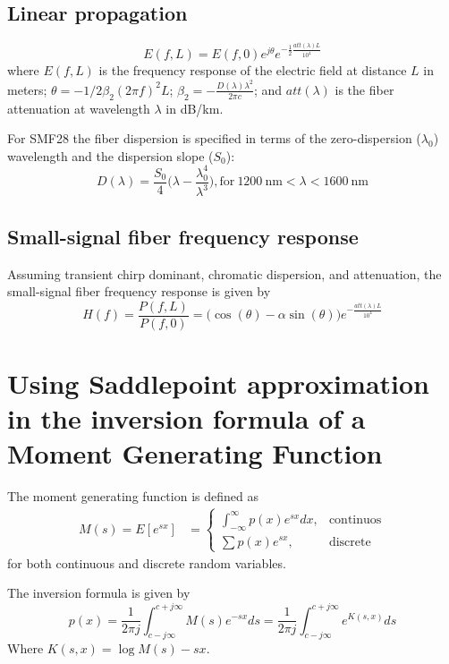 \subsection{Linear propagation}
\begin{equation}
	E(f, L) = E(f, 0)e^{j\theta}e^{-\frac{1}{2}\frac{att(\lambda)L}{10^4}}
\end{equation}
where $E(f, L)$ is the frequency response of the electric field at distance $L$ in meters; $\theta = -1/2\beta_2(2\pi f)^2L$; $\beta_2 = -\frac{D(\lambda)\lambda^2}{2\pi c}$; and $att(\lambda)$ is the fiber attenuation at wavelength $\lambda$ in dB/km.

For SMF28 the fiber dispersion is specified in terms of the zero-dispersion ($\lambda_0$) wavelength and the dispersion slope ($S_0$):
\begin{equation}
	D(\lambda) = \frac{S_0}{4}\bigg(\lambda - \frac{\lambda_0^4}{\lambda^3}\bigg), \text{for}~1200~\text{nm} < \lambda < 1600~\text{nm}
\end{equation}

\subsection{Small-signal fiber frequency response}
Assuming transient chirp dominant, chromatic dispersion, and attenuation, the small-signal fiber frequency response is given by
\begin{equation}
	H(f) = \frac{P(f, L)}{P(f, 0)} = \Big(\cos(\theta) - \alpha\sin(\theta)\Big)e^{-\frac{att(\lambda)L}{10^4}}
\end{equation}


\section{Using Saddlepoint approximation in the inversion formula of a Moment Generating Function} 

The moment generating function is defined as
\begin{align}
M(s) = E[e^{sx}] &= \begin{cases}
\int_{-\infty}^{\infty} p(x)e^{sx}dx, & \text{continuos} \\
\sum p(x)e^{sx}, & \text{discrete}
\end{cases}
\end{align}
for both continuous and discrete random variables.

The inversion formula is given by
\begin{equation}
p(x) = \frac{1}{2\pi j}\int_{c-j\infty}^{c+j\infty}M(s)e^{-sx}ds= \frac{1}{2\pi j}\int_{c-j\infty}^{c+j\infty}e^{K(s, x)}ds
\end{equation}
Where $K(s,x) = \log M(s) - sx$.


